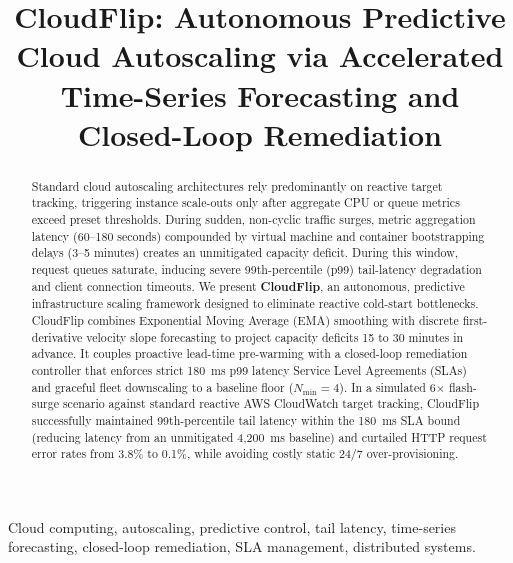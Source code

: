 \documentclass[conference]{IEEEtran}
\begin{document}
\title{CloudFlip: Autonomous Predictive Cloud Autoscaling via Accelerated Time-Series Forecasting and Closed-Loop Remediation}

\author{
}

\maketitle

\begin{abstract}
Standard cloud autoscaling architectures rely predominantly on reactive target tracking, triggering instance scale-outs only after aggregate CPU or queue metrics exceed preset thresholds. During sudden, non-cyclic traffic surges, metric aggregation latency (60--180 seconds) compounded by virtual machine and container bootstrapping delays (3--5 minutes) creates an unmitigated capacity deficit. During this window, request queues saturate, inducing severe 99th-percentile (p99) tail-latency degradation and client connection timeouts. We present \textbf{CloudFlip}, an autonomous, predictive infrastructure scaling framework designed to eliminate reactive cold-start bottlenecks. CloudFlip combines Exponential Moving Average (EMA) smoothing with discrete first-derivative velocity slope forecasting to project capacity deficits 15 to 30 minutes in advance. It couples proactive lead-time pre-warming with a closed-loop remediation controller that enforces strict 180~ms p99 latency Service Level Agreements (SLAs) and graceful fleet downscaling to a baseline floor ($N_{\min} = 4$). In a simulated 6$\times$ flash-surge scenario against standard reactive AWS CloudWatch target tracking, CloudFlip successfully maintained 99th-percentile tail latency within the 180~ms SLA bound (reducing latency from an unmitigated 4,200~ms baseline) and curtailed HTTP request error rates from 3.8\% to 0.1\%, while avoiding costly static 24/7 over-provisioning.
\end{abstract}

\begin{IEEEkeywords}
Cloud computing, autoscaling, predictive control, tail latency, time-series forecasting, closed-loop remediation, SLA management, distributed systems.
\end{IEEEkeywords}
\end{document}
